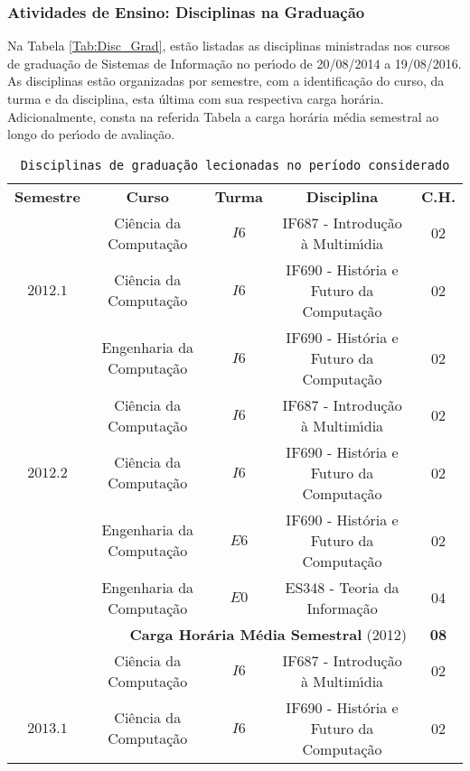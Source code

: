 \subsubsection{Atividades de Ensino: Disciplinas na Gradua\c{c}\~{a}o}
\vspace{0.3cm}

Na Tabela \ref{Tab:Disc_Grad}, est\~{a}o listadas as disciplinas ministradas nos cursos de gradua\c{c}\~{a}o de Sistemas de Informa\c{c}\~{a}o no per\'{\i}odo de 20/08/2014 a 19/08/2016. As disciplinas est\~{a}o organizadas por semestre, com a identifica\c{c}\~{a}o do curso, da turma e da disciplina, esta \'{u}ltima com sua respectiva carga hor\'{a}ria. Adicionalmente, consta na referida Tabela a carga hor\'{a}ria m\'{e}dia semestral ao longo do per\'{\i}odo de avalia\c{c}\~{a}o.

\begin{table}[!htpb]
\centering \small
\caption{\texttt{Disciplinas de gradua\c{c}\~{a}o lecionadas no per\'{\i}odo considerado} }
\begin{tabular}{ccccc}
\toprule
\textbf{Semestre} & \textbf{Curso} & \textbf{Turma} & \textbf{Disciplina} & \textbf{C.H.} \\
\otoprule
  & Ci\^{e}ncia da Computa\c{c}\~{a}o & $I6$ & IF687 - Introdu\c{c}\~{a}o \`{a} Multim\'{\i}dia & 02\\
$2012.1$ & Ci\^{e}ncia da Computa\c{c}\~{a}o & $I6$ & IF690 - Hist\'{o}ria e Futuro da Computa\c{c}\~{a}o & 02\\
  & Engenharia da Computa\c{c}\~{a}o & $I6$ & IF690 - Hist\'{o}ria e Futuro da Computa\c{c}\~{a}o & 02\\
\cmidrule{1-5}
  & Ci\^{e}ncia da Computa\c{c}\~{a}o & $I6$ & IF687 - Introdu\c{c}\~{a}o \`{a} Multim\'{\i}dia & 02\\
$2012.2$ & Ci\^{e}ncia da Computa\c{c}\~{a}o & $I6$ & IF690 - Hist\'{o}ria e Futuro da Computa\c{c}\~{a}o & 02\\
  & Engenharia da Computa\c{c}\~{a}o & $E6$ & IF690 - Hist\'{o}ria e Futuro da Computa\c{c}\~{a}o & 02\\
  & Engenharia da Computa\c{c}\~{a}o & $E0$ & ES348 - Teoria da Informa\c{c}\~{a}o & 04\\
\cmidrule{1-5}
\multicolumn{4}{r}{\textbf{Carga Hor\'{a}ria M\'{e}dia Semestral} (2012)} & \textbf{08} \\
\otoprule
& Ci\^{e}ncia da Computa\c{c}\~{a}o & $I6$ & IF687 - Introdu\c{c}\~{a}o \`{a} Multim\'{\i}dia & 02\\
$2013.1$ & Ci\^{e}ncia da Computa\c{c}\~{a}o & $I6$ & IF690 - Hist\'{o}ria e Futuro da Computa\c{c}\~{a}o & 02\\

\end{tabular}
\end{table}
